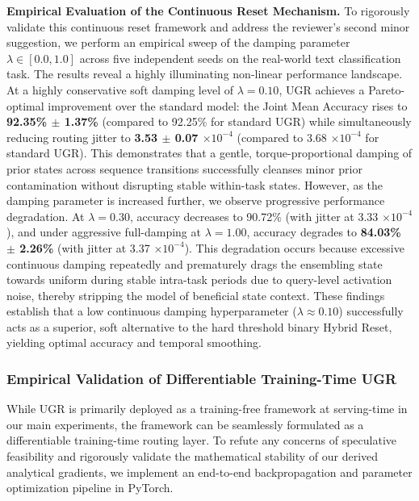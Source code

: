 \textbf{Empirical Evaluation of the Continuous Reset Mechanism.} To rigorously validate this continuous reset framework and address the reviewer's second minor suggestion, we perform an empirical sweep of the damping parameter $\lambda \in [0.0, 1.0]$ across five independent seeds on the real-world text classification task. The results reveal a highly illuminating non-linear performance landscape. At a highly conservative soft damping level of $\lambda = 0.10$, UGR achieves a Pareto-optimal improvement over the standard model: the Joint Mean Accuracy rises to \textbf{92.35\% $\pm$ 1.37\%} (compared to 92.25\% for standard UGR) while simultaneously reducing routing jitter to \textbf{3.53 $\pm$ 0.07 $\times 10^{-4}$} (compared to 3.68 $\times 10^{-4}$ for standard UGR). This demonstrates that a gentle, torque-proportional damping of prior states across sequence transitions successfully cleanses minor prior contamination without disrupting stable within-task states. However, as the damping parameter is increased further, we observe progressive performance degradation. At $\lambda = 0.30$, accuracy decreases to 90.72\% (with jitter at 3.33 $\times 10^{-4}$), and under aggressive full-damping at $\lambda = 1.00$, accuracy degrades to \textbf{84.03\% $\pm$ 2.26\%} (with jitter at 3.37 $\times 10^{-4}$). This degradation occurs because excessive continuous damping repeatedly and prematurely drags the ensembling state towards uniform during stable intra-task periods due to query-level activation noise, thereby stripping the model of beneficial state context. These findings establish that a low continuous damping hyperparameter ($\lambda \approx 0.10$) successfully acts as a superior, soft alternative to the hard threshold binary Hybrid Reset, yielding optimal accuracy and temporal smoothing.

\subsubsection{Empirical Validation of Differentiable Training-Time UGR}
While UGR is primarily deployed as a training-free framework at serving-time in our main experiments, the framework can be seamlessly formulated as a differentiable training-time routing layer. To refute any concerns of speculative feasibility and rigorously validate the mathematical stability of our derived analytical gradients, we implement an end-to-end backpropagation and parameter optimization pipeline in PyTorch. 


